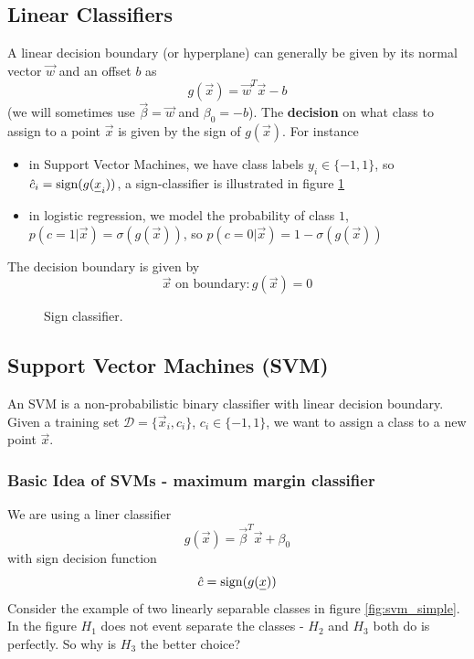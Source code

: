\subsection{Linear Classifiers}
A linear decision boundary (or hyperplane) can generally be
given by its normal vector $\vec{w}$ and an offset $b$ as
\begin{equation}
    g(\vec{x}) = \vec{w}^T \vec{x} - b
\end{equation}
(we will sometimes use $\vec{\beta} = \vec{w}$ and $\beta_0 = -b$).
The \textbf{decision} on what class to assign to a point $\vec{x}$ is given
by the sign of $g(\vec{x})$. For instance
\begin{itemize}
    \item in Support Vector Machines, we have class labels $y_i \in \{-1, 1\}$, so $\hat{c}_i = \sign(g(\vec{x}_i))$, a sign-classifier is illustrated in figure \ref{fig:sign_classifier}
    \item in logistic regression, we model the probability of class $1$, $p(c = 1 | \vec{x}) = \sigma(g(\vec{x}))$, so $p(c = 0 | \vec{x}) = 1 - \sigma(g(\vec{x}))$
\end{itemize}
The decision boundary is given by
\begin{equation}
    \vec{x} \text{ on boundary}: g(\vec{x}) = 0
\end{equation}


\begin{figure}[!htb]
    \centering
    
    \caption{Sign classifier.}
    \label{fig:sign_classifier}
\end{figure}

\subsection{Support Vector Machines (SVM)}
An SVM is a non-probabilistic binary classifier with linear decision boundary. Given
a training set $\mathcal{D} = \{ \vec{x}_i, c_i \}$, $c_i \in \{-1, 1\}$, we want
to assign a class to a new point $\vec{x}$.

\subsubsection{Basic Idea of SVMs - maximum margin classifier}
We are using a liner classifier
\begin{equation}
    g(\vec{x}) = \vec{\beta}^T \vec{x} + \beta_0
\end{equation}
with sign decision function
\begin{equation}
    \hat{c} = \sign(g(\vec{x}))
\end{equation}
Consider the example of two linearly separable classes in figure \ref{fig:svm_simple}. In the figure
$H_1$ does not event separate the classes - $H_2$ and $H_3$ both do is perfectly. So why is
$H_3$ the better choice?

